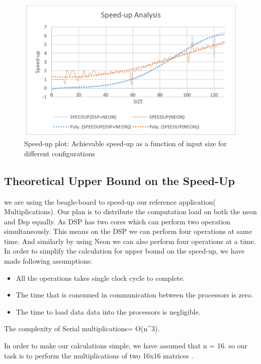 \begin{figure}[h!]
\includegraphics[width=\textwidth]{analysis/speedup_plot}
\caption{Speed-up plot: Achievable speed-up as a function of input size for different configurations}
\label{fig:speedup_plot}
\end{figure}

\subsection{Theoretical Upper Bound on the Speed-Up}

we are using the beagle-board to speed-up our reference application( Multiplications). Our plan is to distribute the  computation load on both the neon and Dsp equally. As DSP has two cores which can perform two operation simultaneously. This means on the DSP we can perform four operations at same time. And similarly by using Neon we can also perform four operations at a time. 
In order to simplify the calculation for upper bound on the speed-up, we  have made following assumptions: 
\begin{itemize}
\item All the operations takes single clock cycle to complete.
\item The time that is consumed in communication between the processors is zero. 
\item The time to load data data into the processors is negligible. 
\end{itemize}

The complexity of Serial multiplications= O(n^3).

In order to make our calculations simple, we have assumed  that n = 16. so our task is to perform the  multiplications of two 16x16 matrices . 

